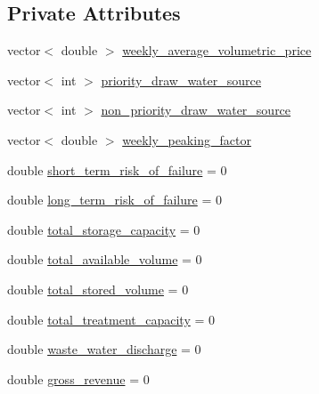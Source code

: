 \subsection*{Private Attributes}
\begin{DoxyCompactItemize}
\item 
vector$<$ double $>$ \mbox{\hyperlink{classUtility_acb779ceddbc1820c8bec7b2f87886d7c_acb779ceddbc1820c8bec7b2f87886d7c}{weekly\+\_\+average\+\_\+volumetric\+\_\+price}}
\item 
vector$<$ int $>$ \mbox{\hyperlink{classUtility_aee22e0941d0116dffa927afac2fd17f9_aee22e0941d0116dffa927afac2fd17f9}{priority\+\_\+draw\+\_\+water\+\_\+source}}
\item 
vector$<$ int $>$ \mbox{\hyperlink{classUtility_a815d7d43f3aca319f717c4e742b19df4_a815d7d43f3aca319f717c4e742b19df4}{non\+\_\+priority\+\_\+draw\+\_\+water\+\_\+source}}
\item 
vector$<$ double $>$ \mbox{\hyperlink{classUtility_abcafce1d14d59e9631c07bf49a131b0d_abcafce1d14d59e9631c07bf49a131b0d}{weekly\+\_\+peaking\+\_\+factor}}
\item 
double \mbox{\hyperlink{classUtility_a13be6c9b210e5f080785b7e2e0c35566_a13be6c9b210e5f080785b7e2e0c35566}{short\+\_\+term\+\_\+risk\+\_\+of\+\_\+failure}} = 0
\item 
double \mbox{\hyperlink{classUtility_ac1cc04e35bc9531440c9d966b50ae22e_ac1cc04e35bc9531440c9d966b50ae22e}{long\+\_\+term\+\_\+risk\+\_\+of\+\_\+failure}} = 0
\item 
double \mbox{\hyperlink{classUtility_a514f6caff5dc9c36588d376a71b933b7_a514f6caff5dc9c36588d376a71b933b7}{total\+\_\+storage\+\_\+capacity}} = 0
\item 
double \mbox{\hyperlink{classUtility_a2a6a6a6240acf6e79a210dac604a5c0b_a2a6a6a6240acf6e79a210dac604a5c0b}{total\+\_\+available\+\_\+volume}} = 0
\item 
double \mbox{\hyperlink{classUtility_af4557d0aba0d4eebbd39ca5fd04ceb30_af4557d0aba0d4eebbd39ca5fd04ceb30}{total\+\_\+stored\+\_\+volume}} = 0
\item 
double \mbox{\hyperlink{classUtility_a61b0a5f18047ef928506660a48cbbb70_a61b0a5f18047ef928506660a48cbbb70}{total\+\_\+treatment\+\_\+capacity}} = 0
\item 
double \mbox{\hyperlink{classUtility_a72385ccc48ab17e14105862389a19b7a_a72385ccc48ab17e14105862389a19b7a}{waste\+\_\+water\+\_\+discharge}} = 0
\item 
double \mbox{\hyperlink{classUtility_ac924f01dbdcc3160c2543b96d8849701_ac924f01dbdcc3160c2543b96d8849701}{gross\+\_\+revenue}} = 0

\end{DoxyCompactItemize}
